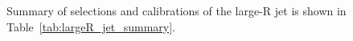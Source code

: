 



Summary of selections and calibrations of the large-R jet is shown in Table~\ref{tab:largeR_jet_summary}.


